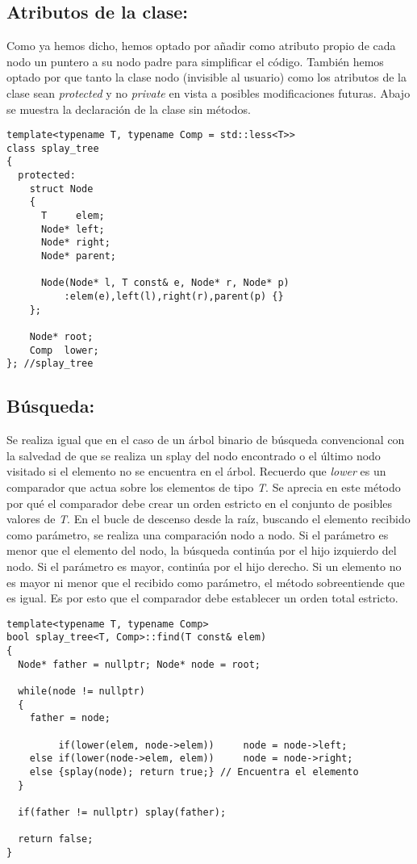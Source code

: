 \documentclass[letterpaper,12pt]{article}
\begin{document}
\subsection{Atributos de la clase:}

Como ya hemos dicho, hemos optado por añadir como atributo propio de cada nodo
un puntero a su nodo padre para simplificar el código. También hemos optado
por que tanto la clase nodo (invisible al usuario) como los atributos de la 
clase sean \textit{protected} y no \textit{private} en vista a posibles 
modificaciones futuras. Abajo se muestra la declaración de la clase sin
métodos.

\begin{lstlisting}
template<typename T, typename Comp = std::less<T>>
class splay_tree
{
  protected:
    struct Node
    {
      T     elem;
      Node* left;
      Node* right;
      Node* parent;

      Node(Node* l, T const& e, Node* r, Node* p) 
          :elem(e),left(l),right(r),parent(p) {}
    };

    Node* root;
    Comp  lower;
}; //splay_tree
\end{lstlisting}

\subsection{Búsqueda:}

Se realiza igual que en el caso de un árbol binario de búsqueda convencional 
con la salvedad de que se realiza un splay del nodo encontrado o el último 
nodo visitado si el elemento no se encuentra en el árbol. Recuerdo que 
\textit{lower} es un comparador que actua sobre los elementos de tipo 
\textit{T}. Se aprecia en este método por qué el comparador debe crear un 
orden estricto en el conjunto de posibles valores de \textit{T}. En el bucle 
de descenso desde la raíz, buscando el elemento recibido como parámetro, se 
realiza una comparación nodo a nodo. Si el parámetro es menor que el elemento 
del nodo, la búsqueda continúa por el hijo izquierdo del nodo. Si el parámetro
es mayor, continúa por el hijo derecho. Si un elemento no es mayor ni menor 
que el recibido como parámetro, el método sobreentiende que es igual. Es por 
esto que el comparador debe establecer un orden total estricto. 

\begin{lstlisting}
template<typename T, typename Comp>
bool splay_tree<T, Comp>::find(T const& elem)
{
  Node* father = nullptr; Node* node = root;

  while(node != nullptr)
  {
    father = node;

         if(lower(elem, node->elem))     node = node->left;
    else if(lower(node->elem, elem))     node = node->right;
    else {splay(node); return true;} // Encuentra el elemento
  }

  if(father != nullptr) splay(father);

  return false;
}
\end{lstlisting}
\end{document}
